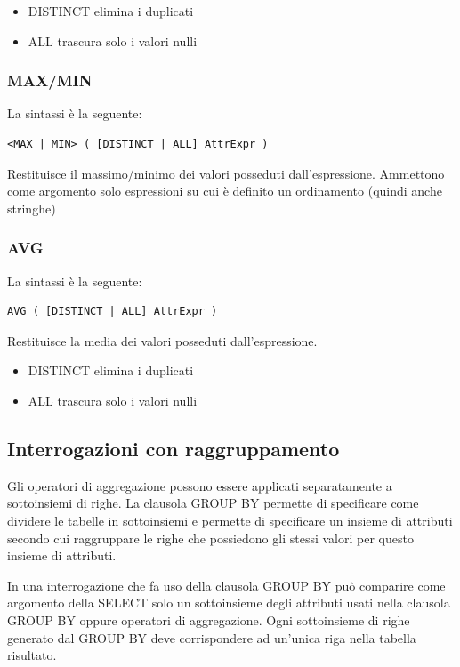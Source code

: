 \documentclass[a4paper]{article}
\begin{document}
\begin{itemize}
  \item DISTINCT elimina i duplicati
  \item ALL trascura solo i valori nulli
\end{itemize}

\subsubsection{MAX/MIN}
La sintassi è la seguente:
\begin{lstlisting}
<MAX | MIN> ( [DISTINCT | ALL] AttrExpr )
\end{lstlisting}
Restituisce il massimo/minimo dei valori posseduti dall’espressione.
Ammettono come argomento solo espressioni su cui è definito un ordinamento (quindi anche
stringhe)

\subsubsection{AVG}
La sintassi è la seguente:
\begin{lstlisting}
AVG ( [DISTINCT | ALL] AttrExpr )
\end{lstlisting}
Restituisce la media dei valori posseduti dall’espressione.

\begin{itemize}
  \item DISTINCT elimina i duplicati
  \item ALL trascura solo i valori nulli
\end{itemize}


\subsection{Interrogazioni con raggruppamento}
Gli operatori di aggregazione possono essere applicati separatamente a sottoinsiemi di righe.
La clausola GROUP BY permette di specificare come dividere le tabelle in sottoinsiemi e
permette di specificare un insieme di attributi secondo cui raggruppare le righe che possiedono
gli stessi valori per questo insieme di attributi.

\vspace{1em}
\noindent
In una interrogazione che fa uso della clausola GROUP BY può comparire
come argomento della SELECT solo un sottoinsieme degli attributi usati nella
clausola GROUP BY oppure operatori di aggregazione.
Ogni sottoinsieme di righe generato dal GROUP BY deve corrispondere ad un’unica riga nella
tabella risultato.
\end{document}
